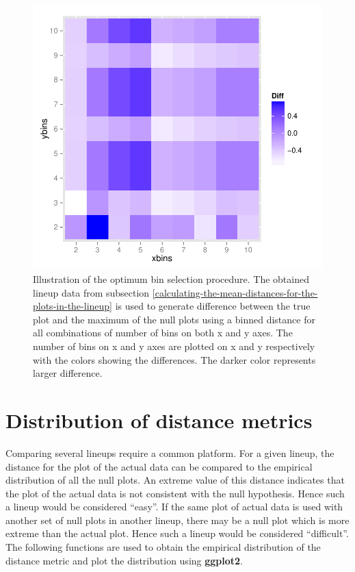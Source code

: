 \begin{figure}[hbtp]
\begin{center}
\includegraphics[scale=0.7]{nullabor-opt-bin.pdf}
\caption{Illustration of the optimum bin selection procedure. The obtained lineup data from subsection \ref{calculating-the-mean-distances-for-the-plots-in-the-lineup} is used to generate difference between the true plot and the maximum of the null plots using a binned distance for all combinations of number of bins on both x and y axes. The number of bins on x and y axes are plotted on x and y respectively with the colors showing the differences. The darker color represents larger difference. }
\label{opt-bin}
\end{center}
\end{figure}

\section{Distribution of distance metrics}\label{distr}

Comparing several lineups require a common platform. For a given lineup, the distance for the plot of the actual data can be compared to the empirical distribution of all the null plots. An extreme value of this distance indicates that the plot of the actual data is not consistent with the null hypothesis. Hence such a lineup would be considered ``easy''. If the same plot of actual data is used with another set of null plots in another lineup, there may be a null plot which is more extreme than the actual plot. Hence such a lineup would be considered ``difficult''. The following functions are used to obtain the empirical distribution of the distance metric and plot the distribution using \textbf{ggplot2}. 

